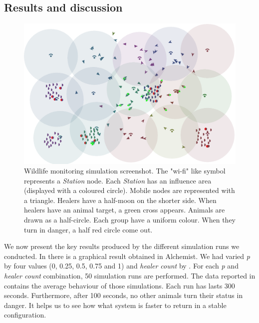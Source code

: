 \subsection{Results and discussion}\label{sb:results}

\begin{figure}[t!]
\centering
\includegraphics[width=\textwidth]{papers/mdpi2020/imgs/alchemist-v2.png}

\caption[Wildlife monitoring simulation screenshot]{Wildlife monitoring simulation screenshot. 
 The "wi-fi" like symbol represents a \emph{Station} node. 
 Each \emph{Station} has an influence area (displayed with a coloured circle). 
 Mobile nodes are represented with a triangle.
 Healers have a half-moon on the shorter side. 
 When healers have an animal target, a green cross appears. 
 Animals are drawn as a half-circle. Each group have a uniform colour. 
 When they turn in danger, a half red circle come out.
}
\label{fig:wildlife-monitoring-gui}
\end{figure}

We now present the key results produced 
 by the different simulation runs we conducted. In  there is
 a graphical result obtained in Alchemist.
%
 We had varied \emph{p} by four values (0, 0.25, 0.5, 0.75 and 1) and \emph{healer count} by . 
 For each \emph{p} and \emph{healer count} combination, 50 simulation runs are performed. 
 The data reported in  contains the average behaviour of those simulations. 
% 
%
Each run has lasts 300 seconds. 
 Furthermore, after 100 seconds, no other animals turn their status in danger.
 It helps us to see how what system is faster to return in a stable configuration.

